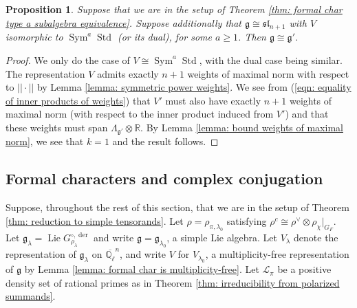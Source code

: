 \documentclass{amsart}
\newtheorem{proposition}[theorem]{Proposition}
\theoremstyle{definition}
\numberwithin{equation}{section} %
\newcommand{\Lie}{\operatorname{Lie}}
\newcommand{\der}{\operatorname{der}}
\newcommand{\sllie}{\mathfrak{sl}}
\newcommand{\Sym}{\operatorname{Sym}}
\newcommand{\Std}{\operatorname{Std}}
\newcommand{\Qlbar}{\ensuremath{\overline{\mathbb{Q}_\ell}}}
\newcommand{\bb}[1]{\mathbb{#1}}
\newcommand{\mf}[1]{\mathfrak{#1}}
\begin{document}
\begin{proposition} \label{prop: symmetric power type A are iso}
Suppose that we are in the setup of Theorem \ref{thm: formal char type a subalgebra equivalence}.
Suppose additionally that $\mf{g} \cong \sllie_{n+1}$ with $V$ isomorphic to $\Sym^a \Std$ (or its dual), for some $a \geq 1$.
Then $\mf{g} \cong \mf{g}'$.
\end{proposition}
\begin{proof}
We only do the case of $V \cong \Sym^a \Std$, with the dual case being similar.
The representation $V$ admits exactly $n+1$ weights of maximal norm with respect to $||\cdot ||$ by Lemma \ref{lemma: symmetric power weights}.
We see from (\ref{eqn: equality of inner products of weights}) that $V'$ must also have exactly $n+1$ weights of maximal norm (with respect to the inner product induced from $V'$) and that these weights must span $\Lambda_{\mf{g}'} \otimes \bb{R}$.
By Lemma \ref{lemma: bound weights of maximal norm}, we see that $k=1$ and the result follows.
\end{proof}

\subsection{Formal characters and complex conjugation}\label{subsect: formal chars and complex conj}

Suppose, throughout the rest of this section, that we are in the setup of Theorem \ref{thm: reduction to simple tensorands}.
Let $\rho = \rho_{\pi,\lambda_0}$ satisfying $\rho^c \cong \rho^\vee \otimes \rho_\chi|_{G_F}$.
Let $\mf{g}_\lambda = \Lie G_{\rho_\lambda}^{\circ, \der}$ and write $\mf{g} = \mf{g}_{\lambda_0}$, a simple Lie algebra.
Let $V_\lambda$ denote the representation of $\mf{g}_\lambda$ on $\Qlbar^n$, and write $V$ for $V_{\lambda_0}$, a multiplicity-free representation of $\mf{g}$ by Lemma \ref{lemma: formal char is multiplicity-free}.
Let $\mathcal{L}_\pi$ be a positive density set of rational primes as in Theorem \ref{thm: irreducibility from polarized summands}.
\end{document}

